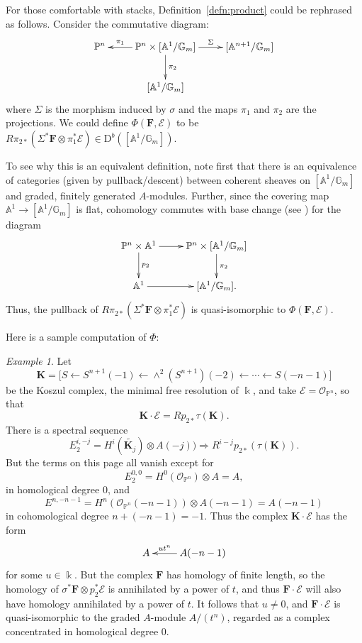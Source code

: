 \documentclass[12pt]{amsart}
\theoremstyle{definition}
\theoremstyle{remark}
\newtheorem{example}[lemma]{Example}
\newcommand{\Spec}{\operatorname{Spec}}
\newcommand{\kk}{\Bbbk}
\newcommand{\PP}{\mathbb{P}}
\renewcommand{\AA}{\mathbb{A}}
\newcommand{\GG}{\mathbb{G}}
\newcommand{\cO}{\mathcal{O}}
\newcommand{\cE}{\mathcal{E}}
\newcommand{\bK}{\mathbf{K}}
\newcommand{\FF}{\mathbf{F}}
\newcommand{\DD}{\mathrm{D}}
\begin{document}
For those comfortable with stacks, Definition~\ref{defn:product}
could be rephrased as follows. Consider the commutative diagram:
\[
\xymatrix{
\PP^n&\PP^{n}\times [\AA^1/\GG_m]\ar[l]_-{\pi_{1}} \ar[r]^-{\Sigma} \ar[d]^{\pi_2}&[\AA^{n+1}/\GG_m]\\
&[\AA^1/\GG_m]&%
}
\]
where $\Sigma$ is the morphism induced by $\sigma$ and the maps $\pi_1$ and $\pi_2$ are the projections.  We could define $\Phi(\FF,\cE)$ to be $R\pi_{2*}\left( \Sigma^*\FF\otimes \pi_{1}^{*}\cE\right)\in \DD^b([\AA^1/\GG_m])$.

To see why this is an equivalent definition, note first  that there is an equivalence of categories (given by pullback/descent) between coherent sheaves on $[\AA^1/\GG_m]$ and graded, finitely generated $A$-modules. Further, since the covering map $\AA^1\to [\AA^1/\GG_m]$ is flat, cohomology commutes with base change (see \cite[0765]{stacks-project}) for the diagram
\[
\xymatrix{
\PP^n\times \AA^1\ar[r]\ar[d]^-{p_2}&\PP^{n}\times [\AA^1/\GG_m]\ar[d]^{\pi_2}\\
\AA^1\ar[r]&[\AA^1/\GG_m].
}
\]
Thus, the pullback of $R\pi_{2*}\left( \Sigma^*\FF\otimes \pi_{1}^{*}\cE\right)$ is quasi-isomorphic 
to $\Phi(\FF,\cE)$.

Here is a sample computation of $\Phi$: 

\begin{example} Let 
$$
\bK = \bigl[ S\gets S^{n+1}(-1) \gets \wedge^{2}(S^{n+1})(-2) \gets\cdots\gets S(-n-1)\bigr]
$$
be the Koszul complex, the minimal free resolution of $\kk$, and take
$\cE = \cO_{\PP^{n}}$, so that 
$$
\bK \cdot \cE = Rp_{2*}\tau(\bK).$$  
There is a spectral sequence
\[
E_2^{i,-j}=H^i(\widetilde{\bK_j})\otimes A(-j))\Rightarrow R^{i-j}p_{2*}(\tau(\bK)).
\]
But 
the terms on this page all vanish except for
$$
E^{0,0}_2= H^{0}(\cO_{\PP^{n}})\otimes A = A,
$$
in homological degree 0, and 
$$
E^{n,-n-1}=H^{n}(\cO_{\PP^{n}}(-n-1)) \otimes  A(-n-1) = A(-n-1)
$$
in cohomological degree $n+(-n-1) = -1$.
Thus the complex $\bK \cdot \cE$ has the form
$$
\xymatrix{
A&A(-n-1)\ar[l]_-{ut^{n}}
}
$$
for some $u\in \kk$. But the complex $\FF$ has homology of finite length, so the homology of $\sigma^{*}\FF \otimes p_{2}^{*}\cE$ is annihilated by a power of $t$, and thus $\FF\cdot \cE$ will also have homology annihilated by a power of $t$. It follows that $u\neq 0$, and $\FF\cdot \cE$ is quasi-isomorphic to the graded $A$-module $A/(t^{n})$, regarded as a complex concentrated in homological degree 0.
\end{example}
\end{document}
